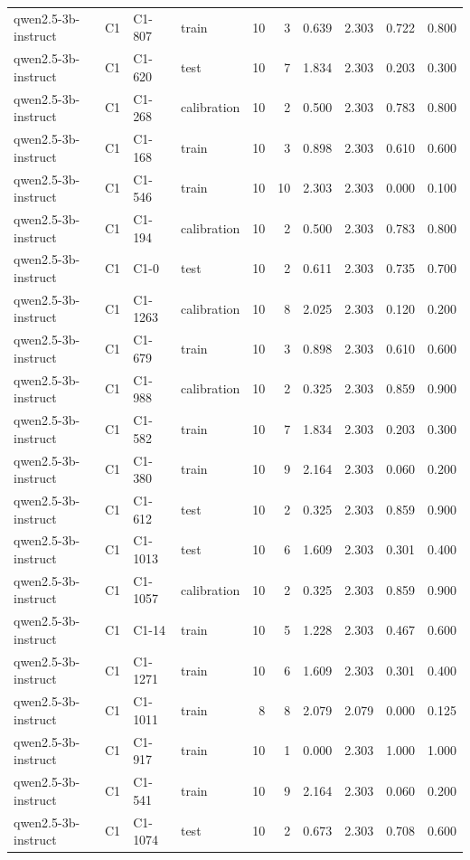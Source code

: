 \begin{table}
\begin{tabular}{llllrrrrrr}
qwen2.5-3b-instruct & C1 & C1-807 & train & 10 & 3 & 0.639 & 2.303 & 0.722 & 0.800 \\
qwen2.5-3b-instruct & C1 & C1-620 & test & 10 & 7 & 1.834 & 2.303 & 0.203 & 0.300 \\
qwen2.5-3b-instruct & C1 & C1-268 & calibration & 10 & 2 & 0.500 & 2.303 & 0.783 & 0.800 \\
qwen2.5-3b-instruct & C1 & C1-168 & train & 10 & 3 & 0.898 & 2.303 & 0.610 & 0.600 \\
qwen2.5-3b-instruct & C1 & C1-546 & train & 10 & 10 & 2.303 & 2.303 & 0.000 & 0.100 \\
qwen2.5-3b-instruct & C1 & C1-194 & calibration & 10 & 2 & 0.500 & 2.303 & 0.783 & 0.800 \\
qwen2.5-3b-instruct & C1 & C1-0 & test & 10 & 2 & 0.611 & 2.303 & 0.735 & 0.700 \\
qwen2.5-3b-instruct & C1 & C1-1263 & calibration & 10 & 8 & 2.025 & 2.303 & 0.120 & 0.200 \\
qwen2.5-3b-instruct & C1 & C1-679 & train & 10 & 3 & 0.898 & 2.303 & 0.610 & 0.600 \\
qwen2.5-3b-instruct & C1 & C1-988 & calibration & 10 & 2 & 0.325 & 2.303 & 0.859 & 0.900 \\
qwen2.5-3b-instruct & C1 & C1-582 & train & 10 & 7 & 1.834 & 2.303 & 0.203 & 0.300 \\
qwen2.5-3b-instruct & C1 & C1-380 & train & 10 & 9 & 2.164 & 2.303 & 0.060 & 0.200 \\
qwen2.5-3b-instruct & C1 & C1-612 & test & 10 & 2 & 0.325 & 2.303 & 0.859 & 0.900 \\
qwen2.5-3b-instruct & C1 & C1-1013 & test & 10 & 6 & 1.609 & 2.303 & 0.301 & 0.400 \\
qwen2.5-3b-instruct & C1 & C1-1057 & calibration & 10 & 2 & 0.325 & 2.303 & 0.859 & 0.900 \\
qwen2.5-3b-instruct & C1 & C1-14 & train & 10 & 5 & 1.228 & 2.303 & 0.467 & 0.600 \\
qwen2.5-3b-instruct & C1 & C1-1271 & train & 10 & 6 & 1.609 & 2.303 & 0.301 & 0.400 \\
qwen2.5-3b-instruct & C1 & C1-1011 & train & 8 & 8 & 2.079 & 2.079 & 0.000 & 0.125 \\
qwen2.5-3b-instruct & C1 & C1-917 & train & 10 & 1 & 0.000 & 2.303 & 1.000 & 1.000 \\
qwen2.5-3b-instruct & C1 & C1-541 & train & 10 & 9 & 2.164 & 2.303 & 0.060 & 0.200 \\
qwen2.5-3b-instruct & C1 & C1-1074 & test & 10 & 2 & 0.673 & 2.303 & 0.708 & 0.600 \\

\end{tabular}
\end{table}
